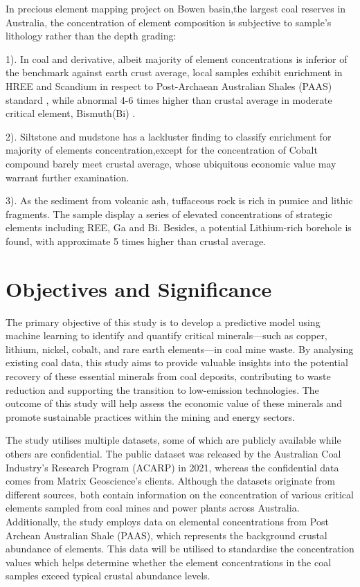 \documentclass[11pt,a4paper,]{article}
\begin{document}
In precious \textcite{Hodgkinson2020} element mapping project on Bowen basin,the largest coal reserves in Australia, the concentration of element composition is subjective to sample's lithology rather than the depth grading:

1). In coal and derivative, albeit majority of element concentrations is inferior of the benchmark against earth crust average, local samples exhibit enrichment in HREE and Scandium in respect to \textcite{McLennan2011} Post-Archaean Australian Shales (PAAS) standard , while abnormal 4-6 times higher than crustal average in moderate critical element, Bismuth(Bi) .

2). Siltstone and mudstone has a lackluster finding to classify enrichment for majority of elements concentration,except for the concentration of Cobalt compound barely meet crustal average, whose ubiquitous economic value may warrant further examination.

3). As the sediment from volcanic ash, tuffaceous rock is rich in pumice and lithic fragments. The sample display a series of elevated concentrations of strategic elements including REE, Ga and Bi. Besides, a potential Lithium-rich borehole is found, with approximate 5 times higher than crustal average.

\section{Objectives and Significance}\label{objectives-and-significance}

The primary objective of this study is to develop a predictive model using machine learning to identify and quantify critical minerals---such as copper, lithium, nickel, cobalt, and rare earth elements---in coal mine waste. By analysing existing coal data, this study aims to provide valuable insights into the potential recovery of these essential minerals from coal deposits, contributing to waste reduction and supporting the transition to low-emission technologies. The outcome of this study will help assess the economic value of these minerals and promote sustainable practices within the mining and energy sectors.

The study utilises multiple datasets, some of which are publicly available while others are confidential. The public dataset was released by the Australian Coal Industry's Research Program (ACARP) in 2021, whereas the confidential data comes from Matrix Geoscience's clients. Although the datasets originate from different sources, both contain information on the concentration of various critical elements sampled from coal mines and power plants across Australia. Additionally, the study employs data on elemental concentrations from Post Archean Australian Shale (PAAS), which represents the background crustal abundance of elements. This data will be utilised to standardise the concentration values which helps determine whether the element concentrations in the coal samples exceed typical crustal abundance levels.
\end{document}

